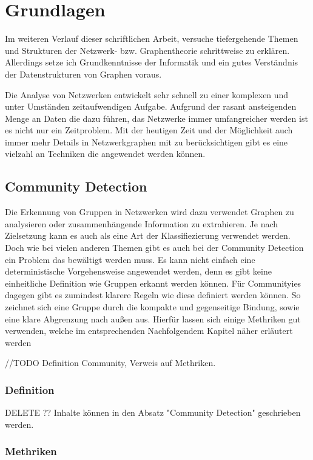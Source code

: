 \chapter{Grundlagen}
Im weiteren Verlauf dieser schriftlichen Arbeit, versuche tiefergehende Themen und Strukturen der Netzwerk- bzw. Graphentheorie schrittweise zu erklären. Allerdings setze ich Grundkenntnisse der Informatik und ein gutes Verständnis der Datenstrukturen von Graphen voraus. 

Die Analyse von Netzwerken entwickelt sehr schnell zu einer komplexen und unter Umständen zeitaufwendigen Aufgabe. Aufgrund der rasant ansteigenden Menge an Daten die dazu führen, das Netzwerke immer umfangreicher werden ist es nicht nur ein Zeitproblem. Mit der heutigen Zeit und der Möglichkeit auch immer mehr Details in Netzwerkgraphen mit zu berücksichtigen gibt es eine vielzahl an Techniken die angewendet werden können.

\section{Community Detection}\label{Community Detection}
Die Erkennung von Gruppen in Netzwerken wird dazu verwendet Graphen zu analysieren oder zusammenhängende Information zu extrahieren. Je nach Zielsetzung kann es auch als eine Art der Klassifiezierung verwendet werden. Doch wie bei vielen anderen Themen gibt es auch bei der Community Detection ein Problem das bewältigt werden muss. Es kann nicht einfach eine deterministische Vorgehensweise angewendet werden, denn es gibt keine einheitliche Definition wie Gruppen erkannt werden können.  Für Communityies dagegen gibt es zumindest klarere Regeln wie diese definiert werden können. So zeichnet sich eine Gruppe durch die kompakte und gegenseitige Bindung, sowie eine klare Abgrenzung nach außen aus. Hierfür lassen sich einige Methriken gut verwenden, welche im entsprechenden Nachfolgendem Kapitel näher erläutert werden

//TODO Definition Community, Verweis auf Methriken.

\subsection{Definition}\label{Definition}
DELETE ?? Inhalte können in den Absatz "Community Detection" geschrieben werden.

\subsection{Methriken}\label{Methriken}


